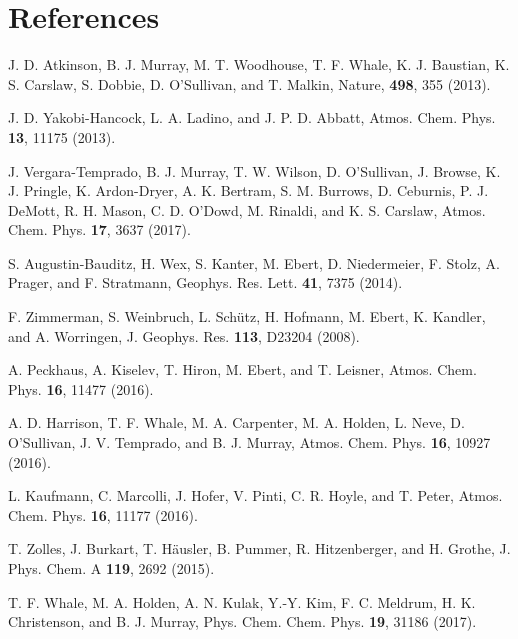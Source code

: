 \documentclass[preprint,aps,prb,floatfix]{revtex4-1}
\begin{document}
\section*{References}
\begin{thebibliography}{10}


 J. D. Atkinson, B. J. Murray, M. T. Woodhouse, T. F. Whale, K. J. Baustian, K. S. Carslaw, S. Dobbie, D. O'Sullivan, and T. Malkin, Nature, {\bf 498}, 355 (2013). 

 J. D. Yakobi-Hancock, L. A. Ladino, and J. P. D. Abbatt, Atmos. Chem. Phys. {\bf 13}, 11175 (2013).

 J. Vergara-Temprado, B. J. Murray, T. W. Wilson, D. O'Sullivan, J. Browse, K. J. Pringle, K. Ardon-Dryer, A. K. Bertram, S. M. Burrows, D. Ceburnis, P. J. DeMott, R. H. Mason, C. D. O'Dowd, M. Rinaldi, and K. S. Carslaw, Atmos. Chem. Phys. {\bf 17}, 3637 (2017). 

 S. Augustin-Bauditz, H. Wex, S. Kanter, M. Ebert, D. Niedermeier, F. Stolz, A. Prager, and F. Stratmann, Geophys. Res. Lett. {\bf 41}, 7375 (2014).  

 F. Zimmerman, S. Weinbruch, L. Sch\"{u}tz, H. Hofmann, M. Ebert, K. Kandler, and A. Worringen, J. Geophys. Res. {\bf 113}, D23204 (2008). 


 A. Peckhaus, A. Kiselev, T. Hiron, M. Ebert, and T. Leisner, Atmos. Chem. Phys. {\bf 16}, 11477 (2016).

 A. D. Harrison, T. F. Whale, M. A. Carpenter, M. A. Holden, L. Neve, D. O'Sullivan, J. V. Temprado, and B. J. Murray, Atmos. Chem. Phys. {\bf 16}, 10927 (2016). 

 L. Kaufmann, C. Marcolli, J. Hofer, V. Pinti, C. R. Hoyle, and T. Peter, Atmos. Chem. Phys. {\bf 16}, 11177 (2016). 


 T. Zolles, J. Burkart, T. H{\"a}usler, B. Pummer, R. Hitzenberger, and H. Grothe, J. Phys. Chem. A {\bf 119}, 2692 (2015). 

 T. F. Whale, M. A. Holden, A. N. Kulak, Y.-Y. Kim, F. C. Meldrum, H. K. Christenson, and B. J. Murray, Phys. Chem. Chem. Phys. {\bf 19}, 31186 (2017). 


\end{thebibliography}
\end{document}
